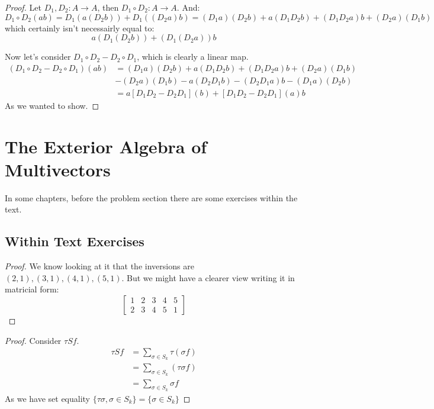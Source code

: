 \begin{problem}
\end{problem}
\begin{proof}
	Let $D_1,D_2: A \to A$, then $D_1 \circ D_2 : A \to A$. And:
	$$D_1 \circ D_2 (ab) = D_1(a(D_2b)) + D_1((D_2a)b) = (D_1a)(D_2b) + a(D_1D_2b) + (D_1D_2a)b + (D_2a)(D_1b)$$
	which certainly isn't necessairly equal to:
	$$a(D_1(D_2b)) + (D_1(D_2a))b$$

	Now let's consider $D_1 \circ D_2 - D_2 \circ D_1$, which is clearly a linear map.
	\begin{align*}
		(D_1 \circ D_2 - D_2 \circ D_1)(ab) & = (D_1a)(D_2b) + a(D_1D_2b) + (D_1D_2a)b + (D_2a)(D_1b) \\
		                                    & - (D_2a)(D_1b) - a(D_2D_1b) - (D_2D_1a)b - (D_1a)(D_2b) \\
		                                    & = a[D_1D_2 - D_2D_1](b) + [D_1D_2 - D_2D_1](a)b
	\end{align*}
	As we wanted to show.
\end{proof}

\section{The Exterior Algebra of Multivectors}
In some chapters, before the problem section there are some exercises within the text.
\subsection{Within Text Exercises}

\begin{customprob}{3.6}
\end{customprob}


\begin{proof}
	We know looking at it that the inversions are $(2,1), (3,1), (4,1), (5,1)$. But we might have a clearer view writing it
	in matricial form:
	$$
		\begin{bmatrix}
			1 & 2 & 3 & 4 & 5 \\
			2 & 3 & 4 & 5 & 1
		\end{bmatrix}
	$$
\end{proof}

\begin{customprob}{3.13}
\end{customprob}
\begin{proof}
	Consider $\tau Sf$.
	\begin{align*}
		\tau Sf & = \sum_{\sigma \in S_k} \tau(\sigma f) \\
		        & = \sum_{\sigma \in S_k} (\tau\sigma f) \\
		        & = \sum_{\sigma \in S_k} \sigma f
	\end{align*}
	As we have set equality $\{\tau \sigma, \sigma \in S_k\} = \{\sigma \in S_k\}$
\end{proof}



